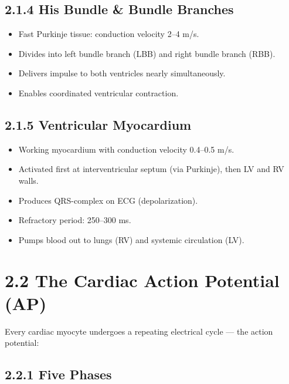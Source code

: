 \documentclass[12pt,oneside,a4paper]{book}
\begin{document}
\subsection{2.1.4 His Bundle \& Bundle Branches}

\begin{itemize}
  \item Fast Purkinje tissue: conduction velocity 2--4 m/s.
  \item Divides into left bundle branch (LBB) and right bundle branch (RBB).
  \item Delivers impulse to both ventricles nearly simultaneously.
  \item Enables coordinated ventricular contraction.
\end{itemize}

\subsection{2.1.5 Ventricular Myocardium}

\begin{itemize}
  \item Working myocardium with conduction velocity 0.4--0.5 m/s.
  \item Activated first at interventricular septum (via Purkinje), then LV and RV walls.
  \item Produces QRS-complex on ECG (depolarization).
  \item Refractory period: 250--300 ms.
  \item Pumps blood out to lungs (RV) and systemic circulation (LV).
\end{itemize}

\section{2.2 The Cardiac Action Potential (AP)}

Every cardiac myocyte undergoes a repeating electrical cycle — the action potential:

\subsection{2.2.1 Five Phases}
\end{document}
